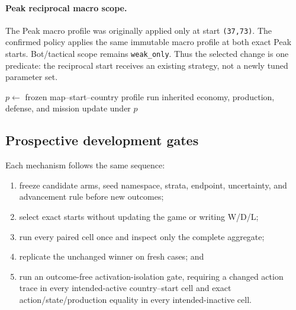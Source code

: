 \paragraph{Peak reciprocal macro scope.}
The Peak macro profile was originally applied only at start \texttt{(37,73)}.
The confirmed policy applies the same immutable macro profile at both exact
Peak starts. Bot/tactical scope remains \texttt{weak\_only}. Thus the selected
change is one predicate: the reciprocal start receives an existing strategy,
not a newly tuned parameter set.

\begin{algorithm}[t]
\DontPrintSemicolon
{}
$p \leftarrow$ frozen map--start--country profile\;
run inherited economy, production, defense, and mission update under $p$\;
\caption{StrongBot's deterministic policy composition. Every branch is scoped
by immutable public map/start/faction state; no opponent identity or hidden
engine field enters dispatch.}
\label{alg:strongbot}
\end{algorithm}

\subsection{Prospective development gates}

Each mechanism follows the same sequence:

\begin{enumerate}
  \item freeze candidate arms, seed namespace, strata, endpoint, uncertainty,
  and advancement rule before new outcomes;
  \item select exact starts without updating the game or writing W/D/L;
  \item run every paired cell once and inspect only the complete aggregate;
  \item replicate the unchanged winner on fresh cases; and
  \item run an outcome-free activation-isolation gate, requiring a changed
  action trace in every intended-active country--start cell and exact
  action/state/production equality in every intended-inactive cell.
\end{enumerate}

